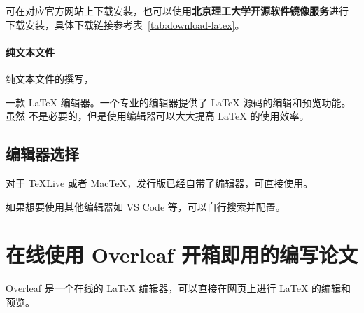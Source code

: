 可在对应官方网站上下载安装，也可以使用\textbf{北京理工大学开源软件镜像服务}进行
下载安装，具体下载链接参考表~\ref{tab:download-latex}。

\begin{table}[htbp]
\centering
{}
\caption{各操作系统下载 \LaTeX{} 发行版位置。}
\label{tab:download-latex}
\end{table}

\paragraph{纯文本文件} 纯文本文件的撰写，

一款 \LaTeX{} 编辑器。一个专业的编辑器提供了 \LaTeX{} 源码的编辑和预览功能。虽然
不是必要的，但是使用编辑器可以大大提高 \LaTeX{} 的使用效率。

\subsection{编辑器选择}

对于 TeXLive 或者 MacTeX，发行版已经自带了编辑器，可直接使用。

如果想要使用其他编辑器如 VS Code 等，可以自行搜索并配置。

\section{在线使用 Overleaf 开箱即用的编写论文}

Overleaf 是一个在线的 \LaTeX{} 编辑器，可以直接在网页上进行 \LaTeX{} 的编辑和预览。

